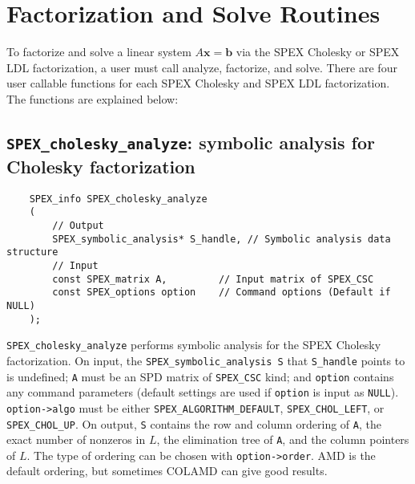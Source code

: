 \documentclass[12pt,oneside]{book}
\theoremstyle{definition}
\begin{document}
\section{Factorization and Solve Routines}

To factorize and solve a linear system $A \mathbf{x} = \mathbf{b}$ via the SPEX Cholesky or SPEX LDL factorization, a user must call analyze, factorize, and solve. There are four user callable functions for each SPEX Cholesky and SPEX LDL factorization. The functions are explained below:


\newpage
\subsection{\texttt{SPEX\_cholesky\_analyze}: symbolic analysis for Cholesky factorization} \label{ss:spex_chol_analyze}
\begin{mdframed}[userdefinedwidth=\textwidth]
{\footnotesize
\begin{verbatim}
    SPEX_info SPEX_cholesky_analyze
    (
        // Output
        SPEX_symbolic_analysis* S_handle, // Symbolic analysis data structure 
        // Input
        const SPEX_matrix A,         // Input matrix of SPEX_CSC
        const SPEX_options option    // Command options (Default if NULL)
    );
    \end{verbatim}
} \end{mdframed}

\verb|SPEX_cholesky_analyze| performs symbolic analysis for the SPEX Cholesky factorization. On input, the \verb|SPEX_symbolic_analysis S| that  \verb|S_handle| points to is undefined;  \verb|A| must be an SPD matrix of \verb|SPEX_CSC| kind;  and \verb|option| contains any command parameters  (default settings are used if
\verb|option| is input as \verb|NULL|).  \verb|option->algo| must be either \verb|SPEX_ALGORITHM_DEFAULT|, \verb|SPEX_CHOL_LEFT|, or \verb|SPEX_CHOL_UP|. On output, \verb|S| contains the row and column ordering of \verb|A|, the exact number of nonzeros in $L$, the elimination tree of \verb|A|, and the column pointers of $L$. The type of ordering can be chosen with \verb|option->order|.   AMD is the default ordering, but sometimes COLAMD can give good results.
\end{document}
